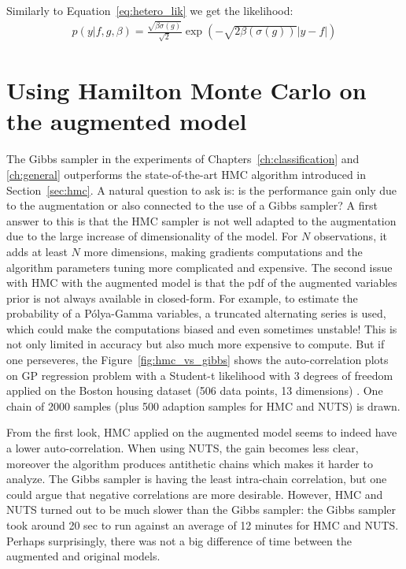 Similarly to Equation~\ref{eq:hetero_lik} we get the likelihood:
\begin{align*}
    p(y|f,g,\beta) = \frac{\sqrt{\beta\sigma(g)}}{\sqrt{2}}\exp\left(-\sqrt{2\beta(\sigma(g))}|y-f|\right)
    \label{eq:hetero_lik_laplace}
\end{align*}

\section{Using Hamilton Monte Carlo on the augmented model}

The Gibbs sampler in the experiments of Chapters~\ref{ch:classification} and \ref{ch:general} outperforms the state-of-the-art \ac{HMC} algorithm introduced in Section~\ref{sec:hmc}.
A natural question to ask is: is the performance gain only due to the augmentation or also connected to the use of a Gibbs sampler?
A first answer to this is that the \ac{HMC} sampler is not well adapted to the augmentation due to the large increase of dimensionality of the model.
For $N$ observations, it adds at least $N$ more dimensions, making gradients computations and the algorithm parameters tuning more complicated and expensive.
The second issue with \ac{HMC} with the augmented model is that the \ac{pdf} of the augmented variables prior is not always available in closed-form.
For example, to estimate the probability of a P\'olya-Gamma variables, a truncated alternating series is used, which could make the computations biased and even sometimes unstable!
This is not only limited in accuracy but also much more expensive to compute.
But if one perseveres, the Figure~\ref{fig:hmc_vs_gibbs} shows the auto-correlation plots on \ac{GP} regression problem with a Student-t likelihood with 3 degrees of freedom applied on the Boston housing dataset (506 data points, 13 dimensions) \cite{harrison1978hedonic}.
One chain of 2000 samples (plus 500 adaption  samples for \ac{HMC} and \ac{NUTS}) is drawn.

From the first look, \ac{HMC} applied on the augmented model seems to indeed have a lower auto-correlation.
When using \ac{NUTS}, the gain becomes less clear, moreover the algorithm produces antithetic chains which makes it harder to analyze.
The Gibbs sampler is having the least intra-chain correlation, but one could argue that negative correlations are more desirable.
However, \ac{HMC} and \ac{NUTS} turned out to be much slower than the Gibbs sampler:
the Gibbs sampler took around 20 sec to run against an average of 12 minutes for \ac{HMC} and \ac{NUTS}.
Perhaps surprisingly, there was not a big difference of time between the augmented and original models.

